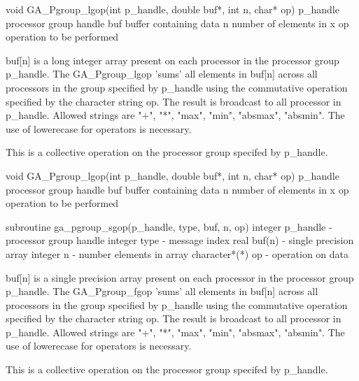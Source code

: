 \documentclass[12pt]{article}
\begin{document}

\begin{capi}
void GA_Pgroup_lgop(int p_handle, double buf*, int n, char* op)
   p_handle                  processor group handle            \access{[input]} 
   buf                       buffer containing data             
   n                         number of elements in x           \access{[input]} 
   op                        operation to be performed         \access{[input]} 
\end{capi}

\begin{desc}

buf[n] is a long integer array present on each processor in the processor group p_handle. The GA_Pgroup_lgop 'sums' all elements in buf[n] across all processors in the group specified by p_handle using the commutative operation specified by the character string op.  The result is broadcast to all processor in p_handle. Allowed strings are "+", "*", "max", "min", "absmax", "absmin". The use of lowerecase for operators is necessary.

This is a collective operation on the processor group specifed by p_handle. 
\end{desc}


\begin{capi}
void GA_Pgroup_lgop(int p_handle, double buf*, int n, char* op)
   p_handle                  processor group handle            \access{[input]} 
   buf                       buffer containing data             
   n                         number of elements in x           \access{[input]} 
   op                        operation to be performed         \access{[input]} 
\end{capi}
\begin{fapi}
subroutine ga_pgroup_sgop(p_handle, type, buf, n, op)
   integer p_handle          - processor group handle      \access{[input]} 
   integer type              - message index               \access{[input]} 
   real buf(n)               - single precision array       
   integer n                 - number elements in array    \access{[input]} 
   character*(*) op          - operation on data           \access{[input]} 
\end{fapi}

\begin{desc}

buf[n] is a single precision array present on each processor in the processor group p_handle. The GA_Pgroup_fgop 'sums' all elements in buf[n] across all processors in the group specified by p_handle using the commutative operation specified by the character string op.  The result is broadcast to all processor in p_handle. Allowed strings are "+", "*", "max", "min", "absmax", "absmin". The use of lowerecase for operators is necessary.

This is a collective operation on the processor group specifed by p_handle. 
\end{desc}
\end{document}
